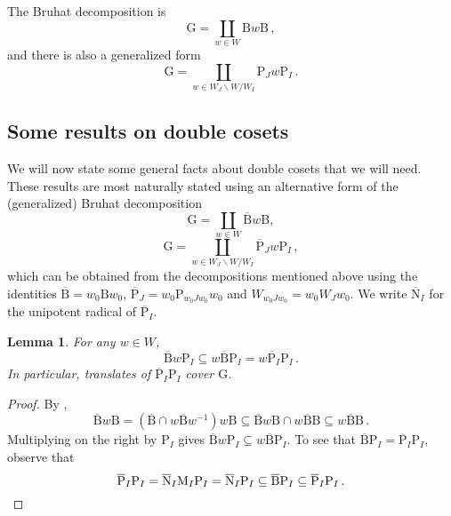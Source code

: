 \documentclass{amsart}
\newtheorem{lemma}[subsubsection]{Lemma}
\theoremstyle{remark}
\numberwithin{equation}{subsection}
\newcommand{\ol}{\overline}
\newcommand{\sub}{\subseteq}
\renewcommand{\(}{\left(}
\renewcommand{\)}{\right)}
\begin{document}
\medskip 

The Bruhat decomposition \cite[Thm. 5.15]{borel-tits} is
\[ \mathrm{G} = \coprod_{w \in W} \mathrm{B} w \mathrm{B} \,, \]
and there is also a generalized form \cite[Cor. 5.20]{borel-tits}
\[ \mathrm{G} = \coprod_{w \in W_J \backslash W / W_I} \mathrm{P}_J w \mathrm{P}_I \,. \]

\subsection{Some results on double cosets}
We will now state some general facts about double cosets that we will need.
These results are most naturally stated using an alternative form of the (generalized) Bruhat decomposition
\[ \mathrm{G} = \coprod_{w \in W} \ol{\mathrm{B}} w \mathrm{B}, \]
\[ \mathrm{G} = \coprod_{w \in W_J \backslash W / W_I} \ol{\mathrm{P}}_J w \mathrm{P}_I \,, \]
which can be obtained from the decompositions mentioned above using the identities
$\ol{\mathrm{B}} = w_0 \mathrm{B} w_0$, $\ol{\mathrm{P}}_J = w_0 \mathrm{P}_{w_{0}Jw_{0}} w_0$ and $W_{w_{0}Jw_{0}}=w_{0}W_{J}w_{0}$. We write $\ol{\mathrm{N}}_{I}$ for the unipotent radical of $\ol{\mathrm{P}}_{I}$.

\begin{lemma} \label{BwPcover}
For any $w \in W$,
\[ \ol{\mathrm{B}} w \mathrm{P}_I \subseteq w \ol{\mathrm{B}} \mathrm{P}_I = w \ol{\mathrm{P}}_I \mathrm{P}_I \,. \]
In particular, translates of $\ol{\mathrm{P}}_I \mathrm{P}_I$ cover $\mathrm{G}$.
\end{lemma}
\begin{proof}
By \cite[Thm.~5.15]{borel-tits},
\[ \ol{\mathrm{B}}w\mathrm{B} = (\ol{\mathrm{B}} \cap w\ol{\mathrm{B}}w^{-1}) w\mathrm{B} \sub \ol{\mathrm{B}}w\mathrm{B} \cap w\ol{\mathrm{B}}\mathrm{B} \subseteq w \ol{\mathrm{B}}\mathrm{B} \,. \]
Multiplying on the right by $\mathrm{P}_I$ gives $\ol{\mathrm{B}} w \mathrm{P}_I \subseteq w \ol{\mathrm{B}} \mathrm{P}_I$.
To see that $\ol{\mathrm{B}} \mathrm{P}_I = \ol{\mathrm{P}}_I \mathrm{P}_I$, observe that
\[ \ol{\mathrm{P}}_I \mathrm{P}_I = \ol{\mathrm{N}}_I \mathrm{M}_I \mathrm{P}_I = \ol{\mathrm{N}}_I \mathrm{P}_I \subseteq \ol{\mathrm{B}} \mathrm{P}_I \subseteq \ol{\mathrm{P}}_I \mathrm{P}_I \,. \qedhere \]
\end{proof}
\end{document}
